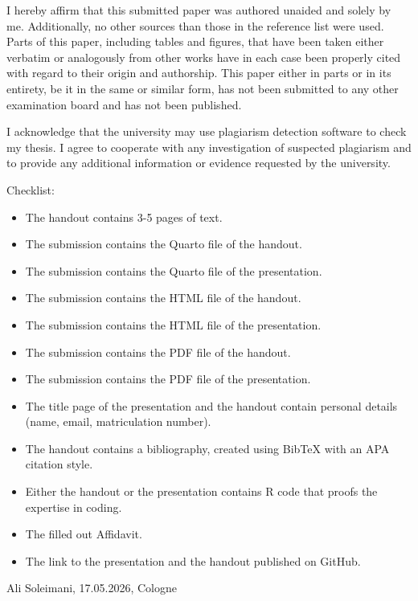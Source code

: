 \documentclass[
  doc,
  longtable,
  a4paper,
  nolmodern,
  notxfonts,
  notimes,
  colorlinks=true,linkcolor=blue,citecolor=blue,urlcolor=blue]{apa7}
\providecommand{\tightlist}{%
  \setlength{\itemsep}{0pt}\setlength{\parskip}{0pt}}
\begin{document}
\begin{tcolorbox}[enhanced jigsaw, arc=.35mm, bottomrule=.15mm, bottomtitle=1mm, breakable, colback=white, colbacktitle=quarto-callout-tip-color!10!white, colframe=quarto-callout-tip-color-frame, coltitle=black, left=2mm, leftrule=.75mm, opacityback=0, opacitybacktitle=0.6, rightrule=.15mm, title={Affidavit}, titlerule=0mm, toprule=.15mm, toptitle=1mm]

I hereby affirm that this submitted paper was authored unaided and
solely by me. Additionally, no other sources than those in the reference
list were used. Parts of this paper, including tables and figures, that
have been taken either verbatim or analogously from other works have in
each case been properly cited with regard to their origin and
authorship. This paper either in parts or in its entirety, be it in the
same or similar form, has not been submitted to any other examination
board and has not been published.

I acknowledge that the university may use plagiarism detection software
to check my thesis. I agree to cooperate with any investigation of
suspected plagiarism and to provide any additional information or
evidence requested by the university.

Checklist:

\begin{itemize}
\tightlist
\item[$\boxtimes$]
  The handout contains 3-5 pages of text.
\item[$\boxtimes$]
  The submission contains the Quarto file of the handout.
\item[$\boxtimes$]
  The submission contains the Quarto file of the presentation.
\item[$\boxtimes$]
  The submission contains the HTML file of the handout.
\item[$\boxtimes$]
  The submission contains the HTML file of the presentation.
\item[$\boxtimes$]
  The submission contains the PDF file of the handout.
\item[$\boxtimes$]
  The submission contains the PDF file of the presentation.
\item[$\boxtimes$]
  The title page of the presentation and the handout contain personal
  details (name, email, matriculation number).
\item[$\boxtimes$]
  The handout contains a bibliography, created using BibTeX with an APA
  citation style.
\item[$\boxtimes$]
  Either the handout or the presentation contains R code that proofs the
  expertise in coding.
\item[$\boxtimes$]
  The filled out Affidavit.
\item[$\boxtimes$]
  The link to the presentation and the handout published on GitHub.
\end{itemize}

Ali Soleimani, 17.05.2026, Cologne

\end{tcolorbox}
\end{document}
